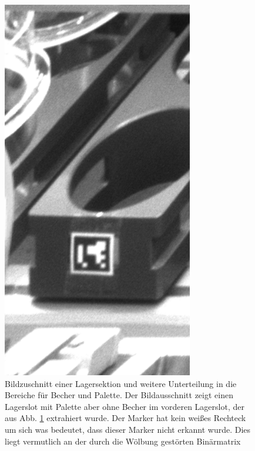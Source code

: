     \begin{figure}
        \caption[Bildzuschnitt auf einen Lagerplatz.]
        {\small Bildzuschnitt einer Lagersektion und weitere Unterteilung in die Bereiche für Becher und Palette. Der Bildausschnitt zeigt einen Lagerslot mit Palette aber ohne Becher im vorderen Lagerslot, der aus Abb. \ref{fig:figure15} extrahiert wurde. Der Marker hat kein weißes Rechteck um sich was bedeutet, dass dieser Marker nicht erkannt wurde. Dies liegt vermutlich an der durch die Wölbung gestörten Binärmatrix}\label{fig:figure15}
        \includegraphics*[width = \textwidth/3]{Bilder/section_16.png}
        \centering
    \end{figure}

